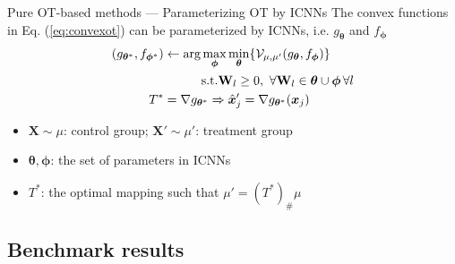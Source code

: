 \documentclass[10pt]{beamer}
\begin{document}
\begin{frame}{Pure OT-based methods --- \normalsize Parameterizing OT by ICNNs}
    The convex functions in Eq. (\ref{eq:convexot}) can be parameterized by ICNNs, 
    i.e. $g_{\bm{\theta}}$ and $f_{\bm{\phi}}$
    \begin{align}
        (g_{\bm{\theta}^*},f_{\bm{\phi}^*}) & \gets \arg\max_{\bm{\phi}}\min_{\bm{\theta}}  \{\- \mathcal{V}_{\mu,\mu'}(g_{\bm{\theta}},f_{\bm{\phi}})
        \} \\
        & \quad\quad\quad\text{s.t.} \mathbf{W}_l \geq 0,\ \forall \mathbf{W}_l \in \bm{\theta}\cup\bm{\phi}\, \forall l \\
        T^* & = \nabla g_{\bm{\theta}^*} 
        \Rightarrow \hat{\bm{x}}_j' = \nabla g_{\bm{\theta}^*}(\bm{x}_j)
    \end{align}
    \begin{itemize}\small
        \item $\bm{X}\sim\mu$: control group; $\bm{X}'\sim\mu'$: treatment group 
        \item $\bm{\theta},\bm{\phi}$: the set of parameters in ICNNs
        \item $T^*$: the optimal mapping such that $\mu' = (T^*)_\#\mu$
    \end{itemize}
    \medskip
\end{frame}



\subsection{Benchmark results}
\end{document}
